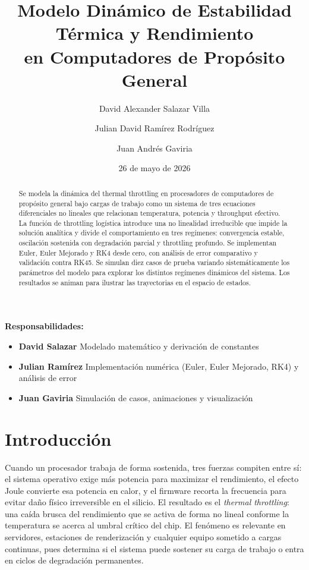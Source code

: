 \documentclass[10pt, twocolumn]{article}
\title{\textbf{Modelo Dinámico de Estabilidad Térmica y Rendimiento\\
       en Computadores de Propósito General}}
\author{%
  David Alexander Salazar Villa \and
  Julian David Ramírez Rodríguez \and
  Juan Andrés Gaviria
}
\date{26 de mayo de 2026}
\begin{document}
\maketitle

\noindent\textbf{Responsabilidades:}
\begin{itemize}\setlength\itemsep{0pt}
  \item \textbf{David Salazar} Modelado matemático y derivación de constantes
  \item \textbf{Julian Ramírez} Implementación numérica (Euler, Euler Mejorado, RK4) y análisis de error
  \item \textbf{Juan Gaviria} Simulación de casos, animaciones y visualización
\end{itemize}

\begin{abstract}
Se modela la dinámica del thermal throttling en procesadores de computadores de propósito general bajo cargas de trabajo como un sistema de tres ecuaciones diferenciales no lineales que relacionan temperatura, potencia y throughput efectivo. La función de throttling logística introduce una no linealidad irreducible que impide la solución analítica y divide el comportamiento en tres regímenes: convergencia estable, oscilación sostenida con degradación parcial y throttling profundo. Se implementan Euler, Euler Mejorado y RK4 desde cero, con análisis de error comparativo y validación contra RK45. Se simulan diez casos de prueba variando sistemáticamente los parámetros del modelo para explorar los distintos regímenes dinámicos del sistema. Los resultados se animan para ilustrar las trayectorias en el espacio de estados.

\end{abstract}

\section{Introducción}
\label{sec:intro}

Cuando un procesador trabaja de forma sostenida, tres fuerzas compiten entre sí: el sistema operativo exige más potencia para maximizar el rendimiento, el efecto Joule convierte esa potencia en calor, y el firmware recorta la frecuencia para evitar daño físico irreversible en el silicio. El resultado es el \emph{thermal throttling}: una caída brusca del rendimiento que se activa de forma no lineal conforme la temperatura se acerca al umbral crítico del chip. El fenómeno es relevante en servidores, estaciones de renderización y cualquier equipo sometido a cargas continuas, pues determina si el sistema puede sostener su carga de trabajo o entra en ciclos de degradación permanentes.
\end{document}
